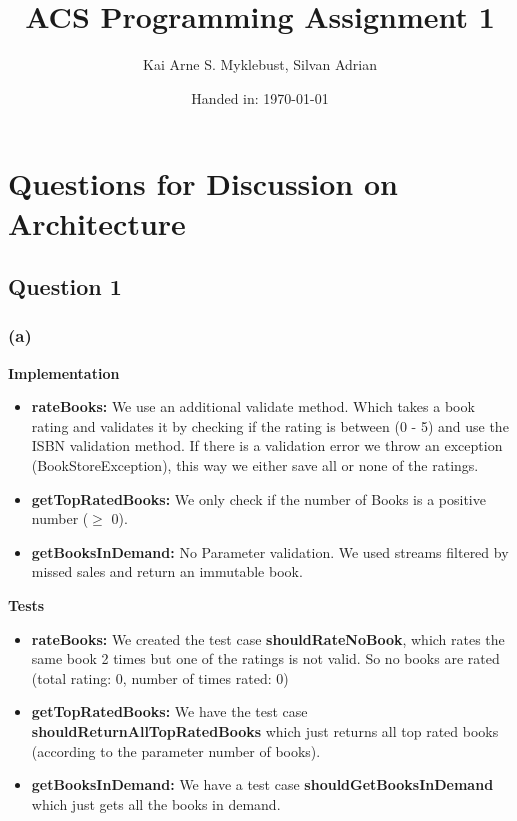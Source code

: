 \documentclass[12pt,a4paper]{article}
\begin{document}
\title{ACS Programming Assignment 1}
\subtitle{}

\author{Kai Arne S. Myklebust, Silvan Adrian}
\date{Handed in: \today}
	
\maketitle
\tableofcontents

\section{Questions for Discussion on Architecture}

\subsection{Question 1}

\subsubsection{(a)}
\textbf{Implementation}
\begin{itemize}
	\item \textbf{rateBooks:} We use an additional validate method. Which takes a book rating and validates it by checking if the rating is between (0 - 5) and use the ISBN validation method. If there is a validation error we throw an exception (BookStoreException), this way we either save all or none of the ratings.
	\item \textbf{getTopRatedBooks:} We only check if the number of Books is a positive number ($\geq$ 0).
	\item \textbf{getBooksInDemand:} No Parameter validation. We used streams filtered by missed sales and return an immutable book.
\end{itemize}
\textbf{Tests}
\begin{itemize}
	\item \textbf{rateBooks:} We created the test case \textbf{shouldRateNoBook}, which rates the same book 2 times but one of the ratings is not valid. So no books are rated (total rating: 0, number of times rated: 0)
	\item \textbf{getTopRatedBooks:} We have the test case \textbf{shouldReturnAllTopRatedBooks} which just returns all top rated books (according to the parameter number of books).
	\item \textbf{getBooksInDemand:} We have a test case \textbf{shouldGetBooksInDemand} which just gets all the books in demand.
\end{itemize}
\end{document}
